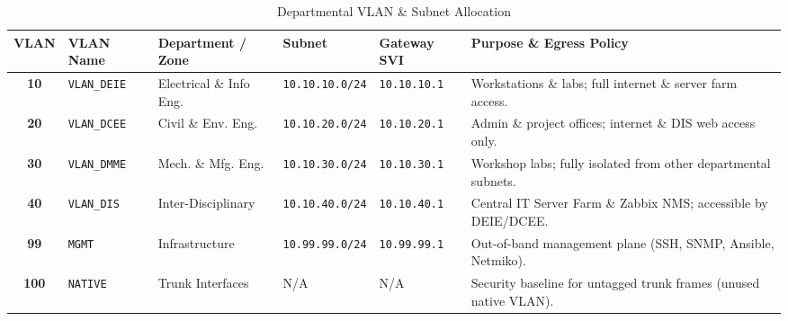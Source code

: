 \documentclass[11pt,a4paper]{article}
\begin{document}
\begin{table}[htbp]
\centering
\caption{Departmental VLAN \& Subnet Allocation}
\label{tab:vlans}
\small
\begin{tabularx}{\textwidth}{@{}c l l l l L@{}}
\toprule
\textbf{VLAN} & \textbf{VLAN Name} & \textbf{Department / Zone} & \textbf{Subnet} & \textbf{Gateway SVI} & \textbf{Purpose \& Egress Policy} \\
\midrule
\textbf{10} & \texttt{VLAN\_DEIE} & Electrical \& Info Eng. & \texttt{10.10.10.0/24} & \texttt{10.10.10.1} & Workstations \& labs; full internet \& server farm access. \\
\textbf{20} & \texttt{VLAN\_DCEE} & Civil \& Env. Eng. & \texttt{10.10.20.0/24} & \texttt{10.10.20.1} & Admin \& project offices; internet \& DIS web access only. \\
\textbf{30} & \texttt{VLAN\_DMME} & Mech. \& Mfg. Eng. & \texttt{10.10.30.0/24} & \texttt{10.10.30.1} & Workshop labs; fully isolated from other departmental subnets. \\
\textbf{40} & \texttt{VLAN\_DIS} & Inter-Disciplinary & \texttt{10.10.40.0/24} & \texttt{10.10.40.1} & Central IT Server Farm \& Zabbix NMS; accessible by DEIE/DCEE. \\
\textbf{99} & \texttt{MGMT} & Infrastructure & \texttt{10.99.99.0/24} & \texttt{10.99.99.1} & Out-of-band management plane (SSH, SNMP, Ansible, Netmiko). \\
\textbf{100} & \texttt{NATIVE} & Trunk Interfaces & N/A & N/A & Security baseline for untagged trunk frames (unused native VLAN). \\
\bottomrule
\end{tabularx}
\end{table}
\end{document}
